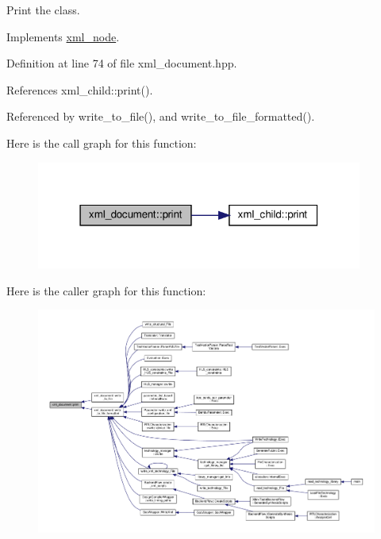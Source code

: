 Print the class. 



Implements \hyperlink{classxml__node_a150e224e18301e5842d10a5e47cc2661}{xml\+\_\+node}.



Definition at line 74 of file xml\+\_\+document.\+hpp.



References xml\+\_\+child\+::print().



Referenced by write\+\_\+to\+\_\+file(), and write\+\_\+to\+\_\+file\+\_\+formatted().

Here is the call graph for this function\+:
\nopagebreak
\begin{figure}[H]
\begin{center}
\leavevmode
\includegraphics[width=304pt]{d8/dee/classxml__document_ac55f82f4aac49a623187eb872a164af9_cgraph}
\end{center}
\end{figure}
Here is the caller graph for this function\+:
\nopagebreak
\begin{figure}[H]
\begin{center}
\leavevmode
\includegraphics[width=350pt]{d8/dee/classxml__document_ac55f82f4aac49a623187eb872a164af9_icgraph}
\end{center}
\end{figure}
\mbox{\label{classxml__document_a9542af1b1e91bdbde492ff3213fadef3}} 
